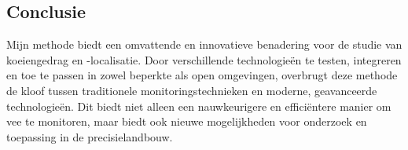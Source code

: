 \subsection{Conclusie}
Mijn methode biedt een omvattende en innovatieve benadering voor de studie van koeiengedrag en -localisatie. Door verschillende technologieën te testen, integreren en toe te passen in zowel beperkte als open omgevingen, overbrugt deze methode de kloof tussen traditionele monitoringstechnieken en moderne, geavanceerde technologieën. Dit biedt niet alleen een nauwkeurigere en efficiëntere manier om vee te monitoren, maar biedt ook nieuwe mogelijkheden voor onderzoek en toepassing in de precisielandbouw.